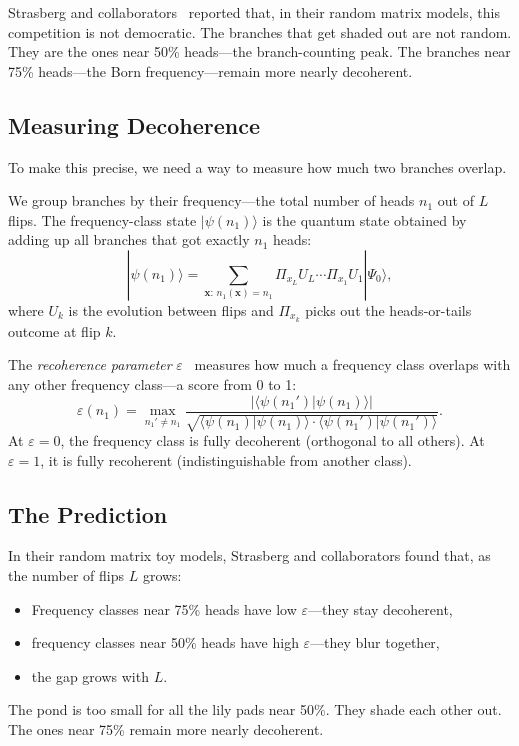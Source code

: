 \documentclass[aps,prd,twocolumn,showpacs,preprintnumbers,amsmath,amssymb,nofootinbib]{revtex4-2}
\begin{document}
Strasberg and collaborators~\cite{StrasbergSchindler2024, Strasberg2025}
reported that, in their random matrix models, this competition is not democratic.
The branches that get shaded out are not random.
They are the ones near 50\% heads---the branch-counting peak. The branches near
75\% heads---the Born frequency---remain more nearly decoherent.

\subsection{Measuring Decoherence}

To make this precise, we need a way to measure how much two branches overlap.

We group branches by their frequency---the total number of heads $n_1$ out of $L$
flips. The frequency-class state $|\psi(n_1)\rangle$ is the quantum state
obtained by adding up all branches that got exactly $n_1$ heads:
\begin{equation}
  \label{eq:freq-class}
  |\psi(n_1)\rangle = \sum_{\mathbf{x}:\, n_1(\mathbf{x}) = n_1}
    \Pi_{x_L} U_L \cdots \Pi_{x_1} U_1 |\Psi_0\rangle,
\end{equation}
where $U_k$ is the evolution between flips and $\Pi_{x_k}$ picks out the
heads-or-tails outcome at flip $k$.

The \emph{recoherence parameter}
$\varepsilon$~\cite{StrasbergSchindler2024} measures how much a frequency class
overlaps with any other frequency class---a score from 0 to 1:
\begin{equation}
  \label{eq:epsilon}
  \varepsilon(n_1) = \max_{n_1' \neq n_1}
    \frac{|\langle\psi(n_1')|\psi(n_1)\rangle|}
         {\sqrt{\langle\psi(n_1)|\psi(n_1)\rangle \cdot \langle\psi(n_1')|\psi(n_1')\rangle}}.
\end{equation}
At $\varepsilon = 0$, the frequency class is fully decoherent (orthogonal to all
others). At $\varepsilon = 1$, it is fully recoherent (indistinguishable from
another class).

\subsection{The Prediction}

In their random matrix toy models, Strasberg and collaborators found that, as the
number of flips $L$ grows:
\begin{itemize}
  \item Frequency classes near 75\% heads have low $\varepsilon$---they stay decoherent,
  \item frequency classes near 50\% heads have high $\varepsilon$---they blur together,
  \item the gap grows with $L$.
\end{itemize}
The pond is too small for all the lily pads near 50\%. They shade each other out.
The ones near 75\% remain more nearly decoherent.
\end{document}
